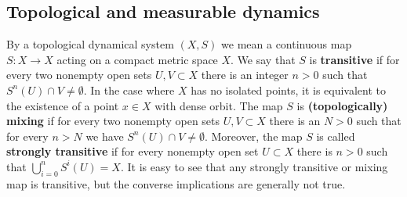 \documentclass[10pt,reqno]{amsart}
\theoremstyle{plain}
\theoremstyle{assumption}
\theoremstyle{notation}
\theoremstyle{claim}
\theoremstyle{conj}
\theoremstyle{theorem}
\theoremstyle{proposition}
\theoremstyle{corollary}
\begin{document}
\subsection{Topological and measurable dynamics}
\label{subsec:topmeasure}

By a topological dynamical system $(X,S)$ we mean a continuous map $S\colon X\to X$ acting on a compact metric space $X$. We say that $S$ is \textbf{transitive} if for every two nonempty open sets $U,V\subset X$ there is an integer $n>0$ such that $S^n(U)\cap V\neq\emptyset$. In the case where $X$ has no isolated points, it is equivalent to the existence of a point $x\in X$ with dense orbit. The map $S$ is \textbf{(topologically) mixing} if for every two nonempty open sets $U, V\subset X$ there is an $N>0$ such that for every $n>N$ we have $S^n(U)\cap V\neq\emptyset$. Moreover, the map $S$ is called \textbf{strongly transitive} if for every nonempty open set $U\subset X$ there is $n>0$ such that $\bigcup_{i=0}^n S^i(U)=X$. It is easy to see that any strongly transitive or mixing map is transitive, but the converse implications are generally not true.
\end{document}
